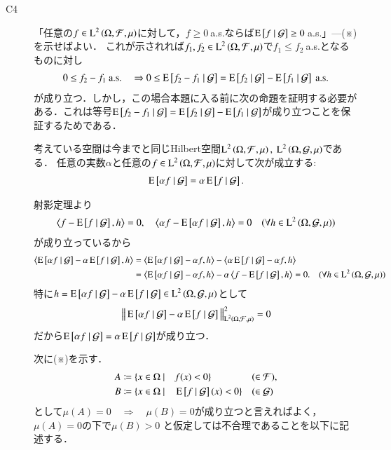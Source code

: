 \begin{prf}
\begin{description}
			\item[C4] 「任意の$f \in \operatorname{L}^{2} \left(\Omega, \mathcal{F},\mu\right)$に対して，$f \geq 0\ $a.s.ならば$\cexp{f}{\mathcal{G}} \geq 0\ $a.s.」---(※)を示せばよい．
				これが示されれば$f_1,f_2 \in \operatorname{L}^{2} \left(\Omega, \mathcal{F},\mu\right)$で$f_1 \leq f_2\ $a.s.となるものに対し
				\begin{align}
					0 \leq f_2 - f_1\ \mathrm{a.s.} \quad \Rightarrow 0 \leq \operatorname{E} \left[ f_2 - f_1 \ \middle|\ \mathcal{G} \right] = \operatorname{E} \left[ f_2 \ \middle|\ \mathcal{G} \right] - \operatorname{E} \left[ f_1 \ \middle|\ \mathcal{G} \right]\ \mathrm{a.s.}
				\end{align}
				が成り立つ．しかし，この場合本題に入る前に次の命題を証明する必要がある．これは等号$\operatorname{E} \left[ f_2 - f_1 \ \middle|\ \mathcal{G} \right] = \operatorname{E} \left[ f_2 \ \middle|\ \mathcal{G} \right] - \operatorname{E} \left[ f_1 \ \middle|\ \mathcal{G} \right]$が成り立つことを保証するためである．
				\begin{prp}
					考えている空間は今までと同じHilbert空間$\operatorname{L}^{2} \left(\Omega, \mathcal{F},\mu\right),\ \operatorname{L}^{2} \left(\Omega, \mathcal{G},\mu\right)$である．
					任意の実数$\alpha$と任意の$f \in \operatorname{L}^{2} \left(\Omega, \mathcal{F},\mu\right)$に対して次が成立する:
					\begin{align}
						\operatorname{E} \left[ \alpha f \ \middle|\ \mathcal{G} \right] = \alpha \operatorname{E} \left[ f \ \middle|\ \mathcal{G} \right].
					\end{align}
				\end{prp}
				\begin{prf}
					射影定理より
					\begin{align}
						\inprod<f - \cexp{f}{\mathcal{G}}, h> = 0, \quad \inprod<\alpha f - \cexp{\alpha f}{\mathcal{G}}, h> = 0 \quad (\forall h \in \Lp{2}{\Omega, \mathcal{G},\mu})
					\end{align}
					が成り立っているから
					\begin{align}
						\inprod<\cexp{\alpha f}{\mathcal{G}} - \alpha \cexp{f}{\mathcal{G}}, h> 
						&= \inprod<\cexp{\alpha f}{\mathcal{G}} - \alpha f, h> - \inprod<\alpha \cexp{f}{\mathcal{G}} - \alpha f, h> \\
						&= \inprod<\cexp{\alpha f}{\mathcal{G}} - \alpha f, h> - \alpha \inprod<f - \cexp{f}{\mathcal{G}}, h> = 0. \quad (\forall h \in \Lp{2}{\Omega, \mathcal{G},\mu})
					\end{align}
					特に$h = \operatorname{E} \left[ \alpha f \ \middle|\ \mathcal{G} \right] - \alpha \operatorname{E} \left[ f \ \middle|\ \mathcal{G} \right] \in \operatorname{L}^{2} \left(\Omega, \mathcal{G},\mu\right)$として
					\begin{align}
						\left\|\, \operatorname{E} \left[ \alpha f \ \middle|\ \mathcal{G} \right] - \alpha \operatorname{E} \left[ f \ \middle|\ \mathcal{G} \right]\, \right\|_{\operatorname{L}^{2} \left(\Omega, \mathcal{F},\mu\right)}^2 = 0
					\end{align}
					だから$\operatorname{E} \left[ \alpha f \ \middle|\ \mathcal{G} \right] = \alpha \operatorname{E} \left[ f \ \middle|\ \mathcal{G} \right]$が成り立つ．
					\QED
				\end{prf}
				次に(※)を示す．
				\begin{align}
					A &\coloneqq \{x \in \Omega\ |\quad f(x) < 0 \} && (\in \mathcal{F}), \\
					B &\coloneqq \{x \in \Omega\ |\quad \operatorname{E} \left[ f \ \middle|\ \mathcal{G} \right](x) < 0 \} && (\in \mathcal{G})
				\end{align}
				として$\mu(A)=0 \quad \Rightarrow \quad \mu(B)=0$が成り立つと言えればよく，$\mu(A) = 0$の下で$\mu(B) > 0$
				と仮定しては不合理であることを以下に記述する．
				

\end{description}
\end{prf}
